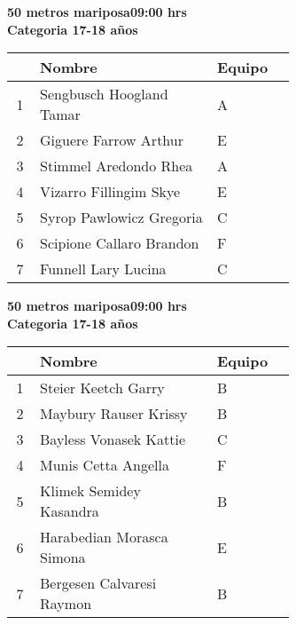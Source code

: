 \begin{minipage}{0.95\linewidth}\vspace{0.5cm} 
\begin{flushleft}
\textbf{
\hspace{-0.15cm}50 metros mariposa\hspace{1.5cm}09:00 hrs \\Categoria 17-18 años}\vspace{-0.2cm} 
\end{flushleft}
\begin{tabular}{cp{0.63\linewidth}l}
\hline
& \textbf{Nombre} & \textbf{Equipo} \\ \hline
1 & Sengbusch Hoogland Tamar & A \\ 
2 & Giguere Farrow Arthur & E \\ 
3 & Stimmel Aredondo Rhea & A \\ 
4 & Vizarro Fillingim Skye & E \\ 
5 & Syrop Pawlowicz Gregoria & C \\ 
6 & Scipione Callaro Brandon & F \\ 
7 & Funnell Lary Lucina & C \\ 
\end{tabular}
\end{minipage}
\begin{minipage}{0.95\linewidth}\vspace{0.5cm} 
\begin{flushleft}
\textbf{
\hspace{-0.15cm}50 metros mariposa\hspace{1.5cm}09:00 hrs \\Categoria 17-18 años}\vspace{-0.2cm} 
\end{flushleft}
\begin{tabular}{cp{0.63\linewidth}l}
\hline
& \textbf{Nombre} & \textbf{Equipo} \\ \hline
1 & Steier Keetch Garry & B \\ 
2 & Maybury Rauser Krissy & B \\ 
3 & Bayless Vonasek Kattie & C \\ 
4 & Munis Cetta Angella & F \\ 
5 & Klimek Semidey Kasandra & B \\ 
6 & Harabedian Morasca Simona & E \\ 
7 & Bergesen Calvaresi Raymon & B \\ 
\end{tabular}
\end{minipage}
